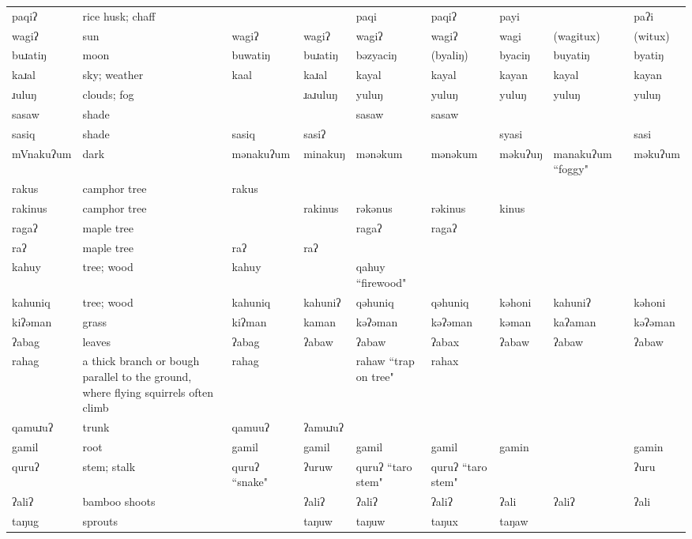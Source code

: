 \begin{landscape}
\begin{longtable}{*{9}{p{}}}
\text{*}paqiʔ & rice husk; chaff &  &  & paqi & paqiʔ & payi &  & paʔi\\
\text{*}wagiʔ & sun & wagiʔ & wagiʔ & wagiʔ & wagiʔ & wagi & (wagitux) & (witux)\\
\text{*}buɹatiŋ & moon & buwatiŋ & buɹatiŋ & bəzyaciŋ & (byaliŋ) & byaciŋ & buyatiŋ & byatiŋ\\
\text{*}kaɹal & sky; weather & kaal & kaɹal & kayal & kayal & kayan & kayal & kayan\\
\text{*}ɹuluŋ & clouds; fog &  & ɹaɹuluŋ & yuluŋ & yuluŋ & yuluŋ & yuluŋ & yuluŋ\\
\text{*}sasaw & shade &  &  & sasaw & sasaw &  &  & \\
\text{*}sasiq & shade & sasiq & sasiʔ &  &  & syasi &  & sasi\\
\text{*}mVnakuʔum & dark & mənakuʔum & minakuŋ & mənəkum & mənəkum & məkuʔuŋ & manakuʔum ``foggy" & məkuʔum\\
\text{*}rakus & camphor tree & rakus &  &  &  &  &  & \\
\text{*}rakinus & camphor tree &  & rakinus & rəkənus & rəkinus & kinus &  & \\
\text{*}ragaʔ & maple tree &  &  & ragaʔ & ragaʔ &  &  & \\
\text{*}raʔ & maple tree & raʔ & raʔ &  &  &  &  & \\
\text{*}kahuy & tree; wood & kahuy &  & qahuy ``firewood" &  &  &  & \\
\text{*}kahuniq & tree; wood & kahuniq & kahuniʔ & qəhuniq & qəhuniq & kəhoni & kahuniʔ & kəhoni\\
\text{*}kiʔəman & grass & kiʔman & kaman & kəʔəman & kəʔəman & kəman & kaʔaman & kəʔəman\\
\text{*}ʔabag & leaves & ʔabag & ʔabaw & ʔabaw & ʔabax & ʔabaw & ʔabaw & ʔabaw\\
\text{*}rahag & a thick branch or bough parallel to the ground, where flying squirrels often climb & rahag &  & rahaw ``trap on tree" & rahax &  &  & \\
\text{*}qamuɹuʔ & trunk & qamuuʔ & ʔamuɹuʔ &  &  &  &  & \\
\text{*}gamil & root & gamil & gamil & gamil & gamil & gamin &  & gamin\\
\text{*}quruʔ & stem; stalk & quruʔ ``snake" & ʔuruw & quruʔ ``taro stem" & quruʔ ``taro stem" &  &  & ʔuru\\
\text{*}ʔaliʔ & bamboo shoots &  & ʔaliʔ & ʔaliʔ & ʔaliʔ & ʔali & ʔaliʔ & ʔali\\
\text{*}taŋug & sprouts &  & taŋuw & taŋuw & taŋux & taŋaw &  & \\

\end{longtable}
\end{landscape}
